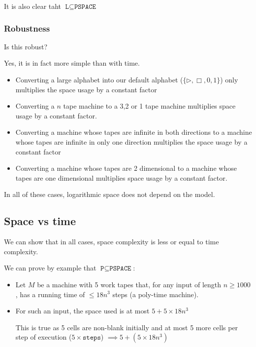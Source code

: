 \documentclass{article}
\begin{document}
  It is also clear taht $\texttt{L} \subseteq \texttt{PSPACE} $

  \subsubsection{Robustness}

  Is this robust?

  Yes, it is in fact more simple than with time.

  \begin{itemize}
    \item Converting a large alphabet into our default alphabet ($\{ \rhd, \Box, 0,1 \} $) only multiplies the space usage by a constant factor

    \item Converting a $n$ tape machine to a 3,2 or 1 tape machine multiplies space usage by a constant factor.

    \item Converting a machine whose tapes are infinite in both directions to a machine whose tapes are infinite in only one direction multiplies the space usage by a constant factor

    \item Converting a machine whose tapes are 2 dimensional to a machine whose tapes are one dimensional multiplies space usage by a constant factor.

  \end{itemize}

  In all of these cases, logarithmic space does not depend on the model.

  \subsection{Space vs time}

  We can show that in all cases, space complexity is less or equal to time complexity.

  We can prove by example that $\texttt{P} \subseteq \texttt{PSPACE} $:

  \begin{itemize}
    \item Let $M$ be a machine with 5 work tapes that, for any input of length $n \geq 1000$, has a running time of $\leq 18n^{3}$ steps (a poly-time machine).
    \item For such an input, the space used is at most $5+5\times 18n^{3}$

          This is true as 5 cells are non-blank initially  and at most 5 more cells per step of execution ($5 \times \texttt{steps}$) $\implies 5 + (5 \times 18n^{3})$
  \end{itemize}
\end{document}
